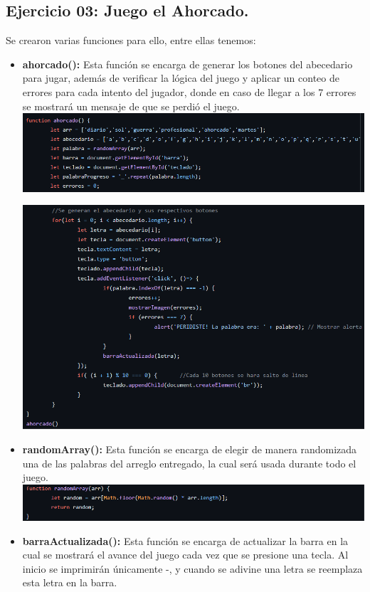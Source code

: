 \documentclass{article}
\begin{document}
\subsection*{Ejercicio 03: Juego el Ahorcado.}
Se crearon varias funciones para ello, entre ellas tenemos:
\begin{itemize}
\item \textbf{ahorcado(): } Esta función se encarga de generar los botones del abecedario para jugar, además de verificar la lógica del juego y aplicar un conteo de errores para cada intento del jugador, donde en caso de llegar a los 7 errores se mostrará un mensaje de que se perdió el juego.\\



\includegraphics[width=\textwidth]{img/7.png}






\includegraphics[width=\textwidth]{img/8.png}
\item \textbf{randomArray(): } Esta función se encarga de elegir de manera randomizada una de las palabras del arreglo entregado, la cual será usada durante todo el juego.\\



\includegraphics[width=\textwidth]{img/11.png}
\item \textbf{barraActualizada(): } Esta función se encarga de actualizar la barra en la cual se mostrará el avance del juego cada vez que se presione una tecla. Al inicio se imprimirán únicamente -, y cuando se adivine una letra se reemplaza esta letra en la barra.\\




\end{itemize}
\end{document}
